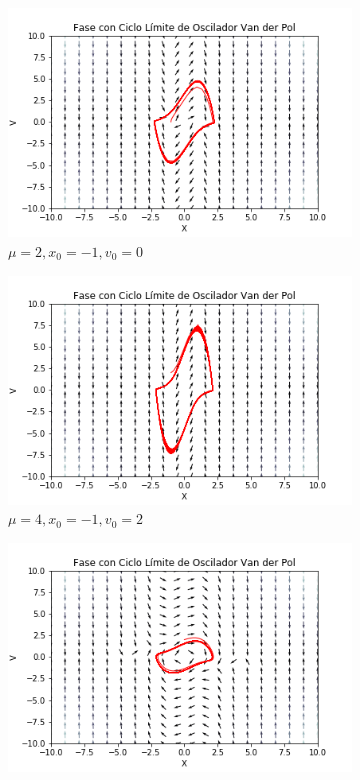 \documentclass[a4paper]{article}
\begin{document}
\begin{figure}[ht!]
\begin{subfigure}{0.5\textwidth}
  \centering
  \includegraphics[width=\linewidth]{VP_Ex2.png}
   \caption{$\mu = 2, x_0 = -1, v_0 = 0$}
\end{subfigure}
\begin{subfigure}{0.5\textwidth}
  \centering
  \includegraphics[width=\linewidth]{VP_Ex3.png}
  \caption{$\mu = 4, x_0 = -1, v_0 = 2$}
\end{subfigure}
\begin{subfigure}{0.5\textwidth}
  \centering
  \includegraphics[width=\linewidth]{VP_Ex4.png}

\end{subfigure}
\end{figure}
\end{document}
